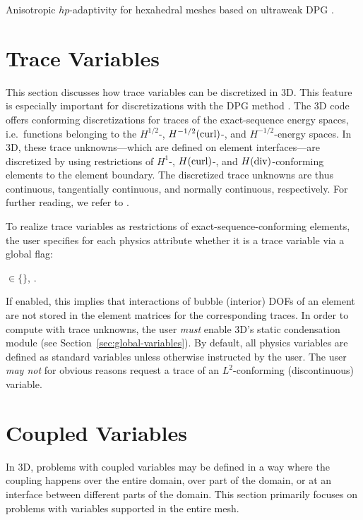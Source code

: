 Anisotropic $hp$-adaptivity for hexahedral meshes based on ultraweak DPG \cite{chakraborty2024hp}.

\section{Trace Variables}
\label{sec:traces}

This section discusses how trace variables can be discretized in \hp3D. This feature is especially important for discretizations with the DPG method \cite{demkowicz2017dpg}. The \hp3D code offers conforming discretizations for traces of the exact-sequence energy spaces, i.e.~functions belonging to the $H^{1/2}$-, $H^{-1/2}(\text{curl})$-, and $H^{-1/2}$-energy spaces. In \hp3D, these trace unknowns---which are defined on element interfaces---are discretized by using restrictions of $H^1$-, $H(\text{curl})$-, and $H(\text{div})$-conforming elements to the element boundary. The discretized trace unknowns are thus continuous, tangentially continuous, and normally continuous, respectively. For further reading, we refer to \cite{demkowicz2018spaces,demkowicz2023fem}.

To realize trace variables as restrictions of exact-sequence-conforming elements, the user specifies for each physics attribute whether it is a trace variable via a global flag:

 $\in \{$$\}$, .

\noindent
If enabled, this implies that interactions of bubble (interior) DOFs of an element are not stored in the element matrices for the corresponding traces. In order to compute with trace unknowns, the user \emph{must} enable \hp3D's static condensation module  (see Section~\ref{sec:global-variables}). By default, all physics variables are defined as standard variables unless otherwise instructed by the user. The user \emph{may not} for obvious reasons request a trace of an $L^2$-conforming (discontinuous) variable.

\section{Coupled Variables}
\label{sec:coupled-variables}

In \hp3D, problems with coupled variables may be defined in a way where the coupling happens over the entire domain, over part of the domain, or at an interface between different parts of the domain. This section primarily focuses on problems with variables supported in the entire mesh.

